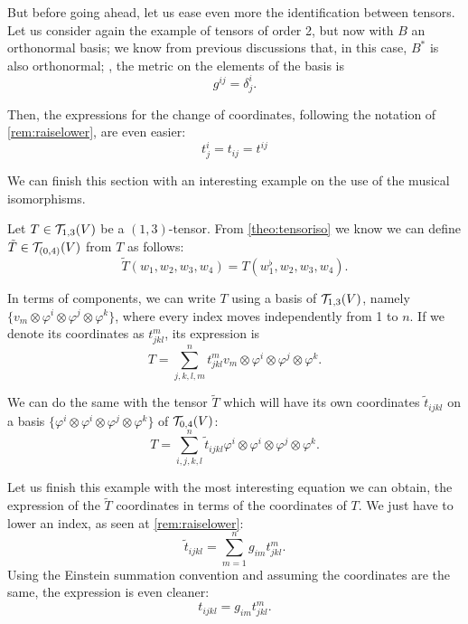 But before going ahead, let us ease even more the identification between tensors. Let us consider again the example of tensors of order 2, but now with $B$ an orthonormal basis; we know from previous discussions that, in this case, $B^*$ is also orthonormal; \ie, the metric on the elements of the basis is
\[
	g^{ij} = \delta^i_j.
\]

Then, the expressions for the change of coordinates, following the notation of \autoref{rem:raiselower}, are even easier:
\[
	t^i_j = t_{ij} = t^{ij}
\]

We can finish this section with an interesting example on the use of the musical isomorphisms.

\begin{example}
	Let $T \in {\mathcal T}_{1,3}(V)$ be a $(1,3)$-tensor. From \autoref{theo:tensoriso} we know we can define $\tilde{T} \in {\mathcal T}_{(0,4)}(V)$ from $T$ as follows:
	\[
		\tilde{T}(w_1, w_2, w_3, w_4) = T(w_1^\flat, w_2, w_3, w_4).
	\]
	
	In terms of components, we can write $T$ using a basis of ${\mathcal T}_{1,3}(V)$, namely $\{v_m \otimes \varphi^i \otimes \varphi^j \otimes \varphi^k\}$, where every index moves independently from 1 to $n$. If we denote its coordinates as $t^m_{jkl}$, its expression is
	\[
		T = \sum_{j,k,l,m}^n t^m_{jkl} v_m \otimes \varphi^i \otimes \varphi^j \otimes \varphi^k.
	\]
	
	We can do the same with the tensor $\tilde{T}$ which will have its own coordinates $\tilde{t}_{ijkl}$ on a basis $\{\varphi^i \otimes \varphi^i \otimes \varphi^j \otimes \varphi^k\}$ of ${\mathcal T}_{0,4}(V)$:
	\[
	T = \sum_{i,j,k,l}^n \tilde{t}_{ijkl} \varphi^i \otimes \varphi^i \otimes \varphi^j \otimes \varphi^k.
	\]
	
	Let us finish this example with the most interesting equation we can obtain, the expression of the $\tilde{T}$ coordinates in terms of the coordinates of $T$. We just have to lower an index, as seen at \autoref{rem:raiselower}:
	\[
		\tilde{t}_{ijkl} = \sum_{m=1}^n g_{im} t^m_{jkl}.
	\]
	Using the Einstein summation convention and assuming the coordinates are the same, the expression is even cleaner:
	\[
	t_{ijkl} = g_{im} t^m_{jkl}.
	\]
	
\end{example}
